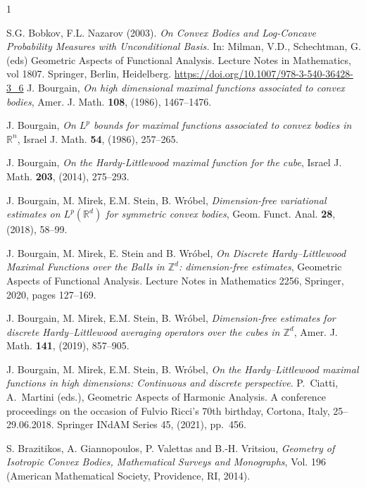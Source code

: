 \documentclass[a4paper,oneside, reqno]{amsart}
\numberwithin{equation}{section}
\theoremstyle{definition}%
\theoremstyle{definition}
\theoremstyle{definition}%
\theoremstyle{definition}
\newcommand{\R}{\mathbb{R}}
\begin{document}
\begin{thebibliography}{1}


\normalsize
\baselineskip=17pt


S.G. Bobkov, F.L. Nazarov (2003). \textit{On Convex Bodies and Log-Concave Probability Measures with Unconditional Basis.} In: Milman, V.D., Schechtman, G. (eds) Geometric Aspects of Functional Analysis. Lecture Notes in Mathematics, vol 1807. Springer, Berlin, Heidelberg. \url{https://doi.org/10.1007/978-3-540-36428-3_6}
J. Bourgain, 
\textit{On high dimensional maximal
  functions associated to convex bodies}, 
	Amer. J.  Math. {\bf 108}, (1986), 1467--1476.
        
J. Bourgain, 
\textit{On $L^p$ bounds for maximal
  functions associated to convex bodies in $\R^n$}, 
	Israel J. Math. {\bf 54}, (1986), 257--265.

J. Bourgain, 
\textit{On the Hardy-Littlewood maximal
  function for the cube}, 
	Israel J. Math.  {\bf 203}, (2014), 275--293.

J. Bourgain, M. Mirek, E.M. Stein, B. Wr\'obel,
\textit{Dimension-free variational estimates on $L^p(\R^d)$ for
  symmetric convex bodies}, 
	Geom. Funct. Anal.
  {\bf 28}, (2018),  58--99.


 J. Bourgain, M. Mirek, E. Stein and B. Wróbel,
\emph{On Discrete Hardy--Littlewood Maximal Functions over the Balls in {$\mathbb{Z}^d$}: dimension-free estimates},
Geometric Aspects of Functional Analysis. Lecture Notes in Mathematics 2256, Springer, 2020, pages 127--169.



   J. Bourgain, M. Mirek, E.M. Stein, B. Wr\'obel,
  \textit{Dimension-free estimates for discrete Hardy--Littlewood
  	averaging operators over the cubes in
  	$\mathbb Z^d$}, 
		Amer. J. Math. {\bf 141}, (2019), 857--905.


	J. Bourgain, M. Mirek, E.M. Stein, B. Wr\'obel,
  \textit{On the Hardy--Littlewood maximal functions in high
  dimensions: Continuous and discrete perspective}.
P.\ Ciatti, A.\ Martini (eds.), Geometric Aspects of
Harmonic Analysis. A conference proceedings  on the occasion of Fulvio Ricci's 70th birthday,
Cortona, Italy, 25--29.06.2018. Springer INdAM Series 45, (2021), pp.\ 456.

S. Brazitikos, A. Giannopoulos, P. Valettas and B.-H. Vritsiou,\textit{ Geometry of Isotropic Convex Bodies, Mathematical Surveys and Monographs}, Vol. 196 (American Mathematical Society, Providence, RI, 2014).


\end{thebibliography}
\end{document}
